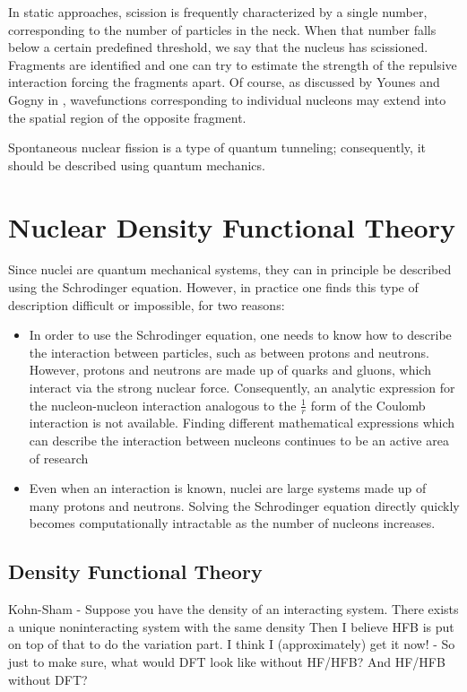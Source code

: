 In static approaches, scission is frequently characterized by a single number, corresponding to the number of particles in the neck. When that number falls below a certain predefined threshold, we say that the nucleus has scissioned. Fragments are identified and one can try to estimate the strength of the repulsive interaction forcing the fragments apart. Of course, as discussed by Younes and Gogny in \cite{Bonneau2007,Younes2011}, wavefunctions corresponding to individual nucleons may extend into the spatial region of the opposite fragment.


Spontaneous nuclear fission is a type of quantum tunneling; consequently, it should be described using quantum mechanics.

\section{Nuclear Density Functional Theory}
Since nuclei are quantum mechanical systems, they can in principle be described using the Schrodinger equation. However, in practice one finds this type of description difficult or impossible, for two reasons:

\begin{itemize}
\item In order to use the Schrodinger equation, one needs to know how to describe the interaction between particles, such as between protons and neutrons. However, protons and neutrons are made up of quarks and gluons, which interact via the strong nuclear force. Consequently, an analytic expression for the nucleon-nucleon interaction analogous to the $\frac{1}{r}$ form of the Coulomb interaction is not available. Finding different mathematical expressions which can describe the interaction between nucleons continues to be an active area of research \cite{lots of papers}
\item Even when an interaction is known, nuclei are large systems made up of many protons and neutrons. Solving the Schrodinger equation directly quickly becomes computationally intractable as the number of nucleons increases.
\end{itemize}


\subsection{Density Functional Theory}\label{sect:DFT}
Kohn-Sham - Suppose you have the density of an interacting system. There exists a unique noninteracting system with the same density
Then I believe HFB is put on top of that to do the variation part. I think I (approximately) get it now! - So just to make sure, what would DFT look like without HF/HFB? And HF/HFB without DFT?

